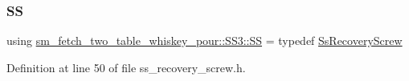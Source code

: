 \subsubsection{\texorpdfstring{SS}{SS}}
{\footnotesize\ttfamily using \hyperlink{namespacesm__fetch__two__table__whiskey__pour_1_1SS3_a6b878b9bd27c9d0c7b640da7bfd2cd88}{sm\+\_\+fetch\+\_\+two\+\_\+table\+\_\+whiskey\+\_\+pour\+::\+S\+S3\+::\+SS} = typedef \hyperlink{structsm__fetch__two__table__whiskey__pour_1_1SS3_1_1SsRecoveryScrew}{Ss\+Recovery\+Screw}}



Definition at line 50 of file ss\+\_\+recovery\+\_\+screw.\+h.

